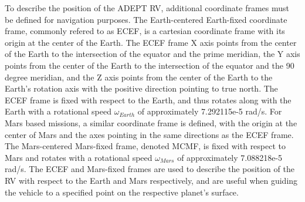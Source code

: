 \documentclass[12pt]{article}
\numberwithin{equation}{section}
\numberwithin{figure}{section}
\numberwithin{table}{section}
\begin{document}
To describe the position of the ADEPT RV, additional coordinate frames must be defined for navigation purposes. The Earth-centered Earth-fixed coordinate frame, commonly refered to as ECEF, is a cartesian coordinate frame with its origin at the center of the Earth. The ECEF frame X axis points from the center of the Earth to the intersection of the equator and the prime meridian, the Y axis points from the center of the Earth to the intersection of the equator and the 90 degree meridian, and the Z axis points from the center of the Earth to the Earth's rotation axis with the positive direction pointing to true north. The ECEF frame is fixed with respect to the Earth, and thus rotates along with the Earth with a rotational speed $\omega_{Earth}$ of approximately 7.292115e-5 rad/s. For Mars based missions, a similar coordinate frame is defined, with the origin at the center of Mars and the axes pointing in the same directions as the ECEF frame. The Mars-centered Mars-fixed frame, denoted MCMF, is fixed with respect to Mars and rotates with a rotational speed $\omega_{Mars}$ of approximately 7.088218e-5 rad/s. The ECEF and Mars-fixed frames are used to describe the position of the RV with respect to the Earth and Mars respectively, and are useful when guiding the vehicle to a specified point on the respective planet's surface.
\end{document}
